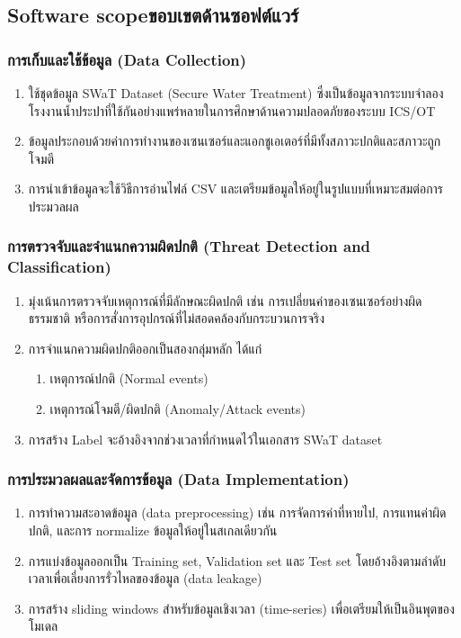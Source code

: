 \subsection{\ifenglish Software scope\else ขอบเขตด้านซอฟต์แวร์\fi}

\subsubsection{การเก็บและใช้ข้อมูล (Data Collection)}
\begin{enumerate}
    \item ใช้ชุดข้อมูล SWaT Dataset (Secure Water Treatment) ซึ่งเป็นข้อมูลจากระบบจำลองโรงงานน้ำประปาที่ใช้กันอย่างแพร่หลายในการศึกษาด้านความปลอดภัยของระบบ ICS/OT
    \item ข้อมูลประกอบด้วยค่าการทำงานของเซนเซอร์และแอกชูเอเตอร์ที่มีทั้งสภาวะปกติและสภาวะถูกโจมตี
    \item การนำเข้าข้อมูลจะใช้วิธีการอ่านไฟล์ CSV และเตรียมข้อมูลให้อยู่ในรูปแบบที่เหมาะสมต่อการประมวลผล
\end{enumerate}

\subsubsection{การตรวจจับและจำแนกความผิดปกติ (Threat Detection and Classification) }
\begin{enumerate}
    \item มุ่งเน้นการตรวจจับเหตุการณ์ที่มีลักษณะผิดปกติ เช่น การเปลี่ยนค่าของเซนเซอร์อย่างผิดธรรมชาติ หรือการสั่งการอุปกรณ์ที่ไม่สอดคล้องกับกระบวนการจริง
    \item การจำแนกความผิดปกติออกเป็นสองกลุ่มหลัก ได้แก่
    \begin{enumerate}
        \item เหตุการณ์ปกติ (Normal events)
        \item เหตุการณ์โจมตี/ผิดปกติ (Anomaly/Attack events)
    \end{enumerate}
    \item การสร้าง Label จะอ้างอิงจากช่วงเวลาที่กำหนดไว้ในเอกสาร SWaT dataset
\end{enumerate}

\subsubsection{การประมวลผลและจัดการข้อมูล (Data Implementation)}
\begin{enumerate}
    \item การทำความสะอาดข้อมูล (data preprocessing) เช่น การจัดการค่าที่หายไป, การแทนค่าผิดปกติ, และการ normalize ข้อมูลให้อยู่ในสเกลเดียวกัน
    \item การแบ่งข้อมูลออกเป็น Training set, Validation set และ Test set โดยอ้างอิงตามลำดับเวลาเพื่อเลี่ยงการรั่วไหลของข้อมูล (data leakage)
    \item การสร้าง sliding windows สำหรับข้อมูลเชิงเวลา (time-series) เพื่อเตรียมให้เป็นอินพุตของโมเดล
\end{enumerate}

